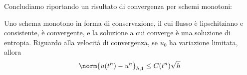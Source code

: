 Concludiamo riportando un risultato di convergenza per schemi monotoni:
\begin{teor}
Uno schema monotono in forma di conservazione, il cui flusso è
lipschitziano e consistente, è convergente, e la soluzione a cui converge
è una soluzione di entropia. Riguardo alla velocità di convergenza,
se $u_0$ ha variazione limitata, allora
\[
\norm{ u(t^n) - u^n }_{h,1} \leq C(t^n) \sqrt{h}
\]
\end{teor}




























